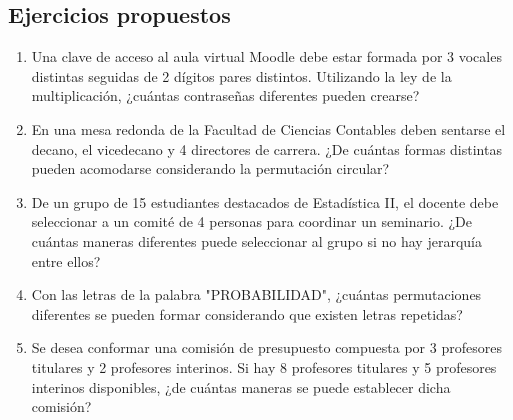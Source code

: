 \documentclass[12pt,a4paper]{article}
\begin{document}
\subsection{Ejercicios propuestos}
\begin{enumerate}
    \item Una clave de acceso al aula virtual Moodle debe estar formada por 3 vocales distintas seguidas de 2 dígitos pares distintos. Utilizando la ley de la multiplicación, ¿cuántas contraseñas diferentes pueden crearse?
    
    \item En una mesa redonda de la Facultad de Ciencias Contables deben sentarse el decano, el vicedecano y 4 directores de carrera. ¿De cuántas formas distintas pueden acomodarse considerando la permutación circular?
    
    \item De un grupo de 15 estudiantes destacados de Estadística II, el docente debe seleccionar a un comité de 4 personas para coordinar un seminario. ¿De cuántas maneras diferentes puede seleccionar al grupo si no hay jerarquía entre ellos?
    
    \item Con las letras de la palabra "PROBABILIDAD", ¿cuántas permutaciones diferentes se pueden formar considerando que existen letras repetidas?
    
    \item Se desea conformar una comisión de presupuesto compuesta por 3 profesores titulares y 2 profesores interinos. Si hay 8 profesores titulares y 5 profesores interinos disponibles, ¿de cuántas maneras se puede establecer dicha comisión?
\end{enumerate}
\end{document}
